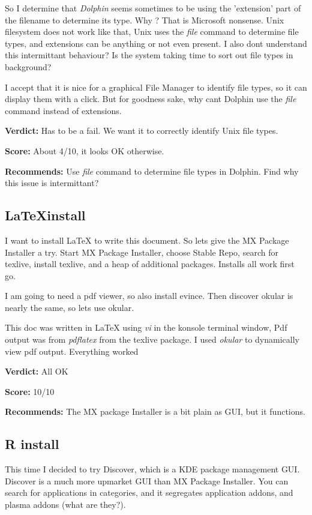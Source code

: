 \documentclass{article}  %
\begin{document}
So  I determine that {\em Dolphin} seems sometimes to be using the 'extension' part of the filename to determine its type. Why ?  That is Microsoft nonsense. Unix filesystem does not work like that, Unix uses the {\em file} command to determine file types, and extensions can be anything or not even present. I also dont understand this intermittant behaviour?  Is the system taking time to sort out file types in background?

I accept that it is nice for a graphical File Manager to identify file types, so it can display them with a click.  But for goodness sake, why cant Dolphin use the {\em file} command instead of extensions. 


{\bf Verdict:} Has to be a fail. We want it to correctly identify Unix file types.

{\bf Score:} About 4/10, it looks OK otherwise.

{\bf Recommends:} Use {\em file} command to determine file types in Dolphin. Find why this issue is intermittant?

\subsection{\LaTeX install}
I want to install \LaTeX \hspace{1pt} to write this document. So lets give the MX Package Installer a try. Start MX Package Installer, choose Stable Repo, search for texlive,
install texlive, and a heap of additional packages.  Installs all work first go.

I am going to need a pdf viewer, so also install evince. Then discover okular is nearly the same, so lets use okular.

This doc was written in  \LaTeX \hspace{1pt} using {\em vi} in the konsole terminal window, Pdf output was from {\em pdflatex} from the texlive package. I used {\em okular} to dynamically view pdf output. Everything worked

{\bf Verdict:} All OK

{\bf Score:} 10/10

{\bf Recommends:} The MX package Installer is a bit plain as GUI, but it functions.

\subsection{R install}
This time I decided to try Discover, which is a KDE package management GUI.  Discover is a much more upmarket GUI than MX Package Installer. You can search for applications in categories, and it segregates application addons, and plasma addons (what are they?). 
\end{document}
